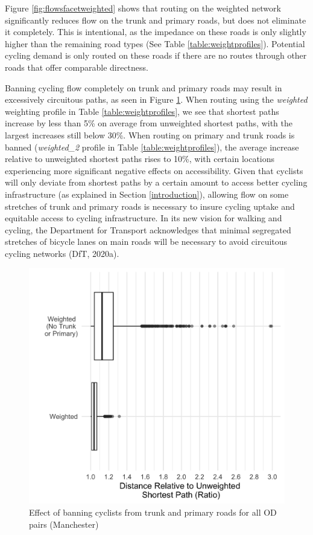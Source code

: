 \documentclass[
]{article}
\begin{document}
Figure \ref{fig:flowsfacetweighted} shows that routing on the weighted
network significantly reduces flow on the trunk and primary roads, but
does not eliminate it completely. This is intentional, as the impedance
on these roads is only slightly higher than the remaining road types (See
Table \ref{table:weightprofiles}). Potential cycling demand is only
routed on these roads if there are no routes through other roads that
offer comparable directness.

Banning cycling flow completely on trunk and primary roads may result in
excessively circuitous paths, as seen in Figure
\ref{fig:boxplotcircuity}. When routing using the \emph{weighted} weighting
profile in Table \ref{table:weightprofiles}, we see that shortest paths
increase by less than 5\% on average from unweighted shortest paths, with
the largest increases still below 30\%. When routing on primary and trunk
roads is banned (\emph{weighted\_2} profile in Table
\ref{table:weightprofiles}), the average increase relative to
unweighted shortest paths rises to 10\%, with certain locations
experiencing more significant negative effects on accessibility. Given
that cyclists will only deviate from shortest paths by a certain amount
to access better cycling infrastructure (as explained in Section
\ref{introduction}), allowing flow on some stretches of trunk and
primary roads is necessary to insure cycling uptake and equitable access
to cycling infrastructure. In its new vision for walking and cycling,
the Department for Transport acknowledges that minimal segregated
stretches of bicycle lanes on main roads will be necessary to avoid
circuitous cycling networks (DfT, 2020a).

\begin{figure}

{\centering \includegraphics[width=0.5\linewidth]{data/Manchester/Plots/boxplot_weighted_unweighted_distances} 

}

\caption{Effect of banning cyclists from trunk and primary roads for all OD pairs (Manchester)}\label{fig:boxplotcircuity}
\end{figure}
\end{document}
